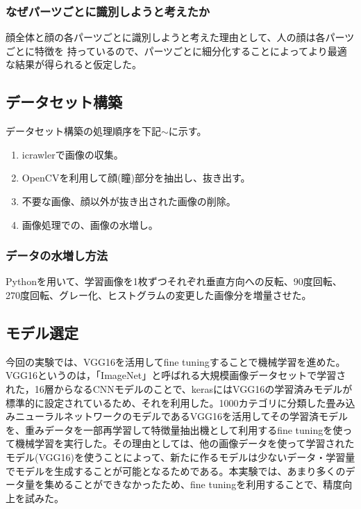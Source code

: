 \documentclass[a4paper, 11pt, titlepage]{jsarticle}
\begin{document}
\subsubsection{なぜパーツごとに識別しようと考えたか}
顔全体と顔の各パーツごとに識別しようと考えた理由として、人の顔は各パーツごとに特徴を
持っているので、パーツごとに細分化することによってより最適な結果が得られると仮定した。

\subsection{データセット構築}
データセット構築の処理順序を下記$\sim$に示す。

\begin{enumerate}
\item{icrawlerで画像の収集。}
\item{OpenCVを利用して顔(瞳)部分を抽出し、抜き出す。}
\item{不要な画像、顔以外が抜き出された画像の削除。}
\item{画像処理での、画像の水増し。}
\end{enumerate}

\subsubsection{データの水増し方法}
Pythonを用いて、学習画像を1枚ずつそれぞれ垂直方向への反転、90度回転、270度回転、グレー化、ヒストグラムの変更した画像分を増量させた。

\subsection{モデル選定}
今回の実験では、VGG16を活用してfine tuningすることで機械学習を進めた。VGG16というのは，「ImageNet」と呼ばれる大規模画像データセットで学習された，16層からなるCNNモデルのことで、kerasにはVGG16の学習済みモデルが標準的に設定されているため、それを利用した。1000カテゴリに分類した畳み込みニューラルネットワークのモデルであるVGG16を活用してその学習済モデルを、重みデータを一部再学習して特徴量抽出機として利用するfine tuningを使って機械学習を実行した。その理由としては、他の画像データを使って学習されたモデル(VGG16)を使うことによって、新たに作るモデルは少ないデータ・学習量でモデルを生成することが可能となるためである。本実験では、あまり多くのデータ量を集めることができなかったため、fine tuningを利用することで、精度向上を試みた。
\end{document}
